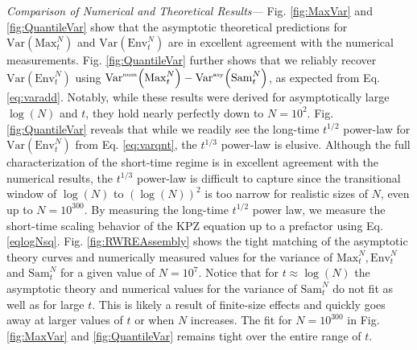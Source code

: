 \documentclass[%
 reprint,
 amsmath,amssymb,
 longbibliography,
 aps,
prl
]{revtex4-1}
\newcommand{\var}[1]{\mathrm{Var}\left(#1\right)}
\newcommand{\varasy}[1]{\mathrm{Var}^{\textrm{\tiny{asy}}}\!\left(#1\right)}
\newcommand{\varnum}[1]{\mathrm{Var}^{\textrm{\tiny{num}}}\!\left(#1\right)}
\def\maxnt{\mathrm{Max}^{N}_t}
\def\envnt{\mathrm{Env}^{N}_t}
\def\snt{\mathrm{Sam}^{N}_t}
\begin{document}
\medskip\noindent\emph{Comparison of Numerical and Theoretical Results---}
Fig. \ref{fig:MaxVar} and \ref{fig:QuantileVar} show that the asymptotic theoretical predictions for $\var{\maxnt}$ and $\var{\envnt}$ are in excellent agreement with the numerical measurements.  Fig. \ref{fig:QuantileVar} further shows that we reliably recover $\var{\envnt}$ using $\varnum{\maxnt} - \varasy{\snt}$, as expected from Eq. \ref{eq:varadd}. Notably, while these results were derived for asymptotically large $\log(N)$ and $t$, they hold nearly perfectly down to $N=10^{2}$.
Fig. \ref{fig:QuantileVar} reveals that while we readily see the long-time $t^{1/2}$ power-law for $\var{\envnt}$ from Eq. \ref{eq:varqnt}, the $t^{1/3}$ power-law is elusive. Although the full characterization of the short-time regime is in excellent agreement with the numerical results, the $t^{1/3}$ power-law is difficult to capture since the transitional window of $\log(N)$ to $(\log(N))^2$ is too narrow for realistic sizes of $N$, even up to $N=10^{300}$. By measuring the long-time $t^{1/2}$ power law, we measure the short-time scaling behavior of the KPZ equation up to a prefactor using Eq. \ref{eqlogNsq}. Fig. \ref{fig:RWREAssembly} shows the tight matching of the asymptotic theory curves and numerically measured values for the variance of $\maxnt, \envnt$ and $\snt$ for a given value of $N=10^7$. Notice that for $t\approx \log(N)$ the asymptotic theory and numerical values for the variance of $\snt$ do not fit as well as for large $t$. This is likely a result of finite-size effects and quickly goes away at larger values of $t$ or when $N$ increases. The fit for $N=10^{300}$ in Fig. \ref{fig:MaxVar} and \ref{fig:QuantileVar} remains tight over the entire range of $t$.
\end{document}
